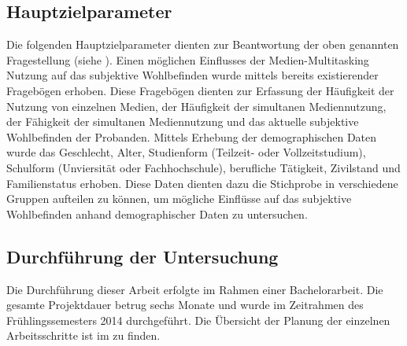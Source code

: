 \subsection{Hauptzielparameter}\label{subsection.hauptzielparameter}
Die folgenden Hauptzielparameter dienten zur Beantwortung der oben genannten Fragestellung (siehe ). Einen möglichen Einflusses der Medien-Multitasking Nutzung auf das subjektive Wohlbefinden wurde mittels bereits existierender Fragebögen erhoben. Diese Fragebögen dienten zur Erfassung der Häufigkeit der Nutzung von einzelnen Medien, der Häufigkeit der simultanen Mediennutzung, der Fähigkeit der simultanen Mediennutzung und das aktuelle subjektive Wohlbefinden der Probanden. Mittels Erhebung der demographischen Daten wurde das Geschlecht, Alter, Studienform (Teilzeit- oder Vollzeitstudium), Schulform (Unviersität oder Fachhochschule), berufliche Tätigkeit, Zivilstand und Familienstatus erhoben. Diese Daten dienten dazu die Stichprobe in verschiedene Gruppen aufteilen zu können, um mögliche Einflüsse auf das subjektive Wohlbefinden anhand demographischer Daten zu untersuchen.

\subsection{Durchführung der Untersuchung}
Die Durchführung dieser Arbeit erfolgte im Rahmen einer Bachelorarbeit. Die gesamte Projektdauer betrug sechs Monate und wurde im Zeitrahmen des Frühlingssemesters 2014 durchgeführt. Die Übersicht der Planung der einzelnen Arbeitsschritte ist im  zu finden.

